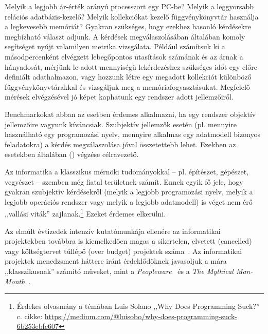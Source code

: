 \label{cha:benchmarking}

\graphicspath{ {./benchmarking/figures/} }

Melyik a legjobb ár-érték arányú processzort egy PC-be? Melyik a leggyorsabb relációs adatbázis-kezelő? Melyik kollekciókat kezelő függvénykönyvtár használja a legkevesebb memóriát? Gyakran szükséges, hogy ezekhez hasonló kérdésekre megbízható választ adjunk. A kérdések megválaszolásában általában komoly segítséget nyújt valamilyen metrika vizsgálata. Például számítsuk ki a másodpercenként elvégzett lebegőpontos utasítások számának és az árnak a hányadosát, mérjünk le adott mennyiségű lekérdezéshez szükséges időt egy előre definiált adathalmazon, vagy hozzunk létre egy megadott kollekciót különböző függvénykönyvtárakkal és vizsgáljuk meg a memóriafogyasztásukat. Megfelelő mérések elvégzésével jó képet kaphatunk egy rendszer adott jellemzőiről.

\begin{megjegyzes}
	Benchmarkokat abban az esetben érdemes alkalmazni, ha egy rendszer objektív jellemzőire vagyunk kíváncsiak. Szubjektív jellemzők esetén (pl. mennyire használható egy programozási nyelv, mennyire alkalmas egy adatmodell bizonyos feladatokra) a kérdés megválaszolása jóval összetettebb lehet. Ezekben az esetekben általában  () végzése célravezető.
	
	Az informatika a klasszikus mérnöki tudományokkal -- pl. építészet, gépészet, vegyészet -- szemben még fiatal területnek számít. Ennek egyik fő jele, hogy gyakran szubjektív kérdésekről (melyik a legjobb programozási nyelv, melyik a legjobb operációs rendszer vagy melyik a legjobb adatmodell) is véget nem érő ,,vallási viták'' zajlanak.\footnote{Érdekes olvasmány a témában Luis Solano ,,Why Does Programming Suck?'' c. cikke: \url{https://medium.com/@luisobo/why-does-programming-suck-6b253ebfc607}} Ezeket érdemes elkerülni.
	
	Az elmúlt évtizedek intenzív kutatómunkája ellenére az informatikai projektekben továbbra is kiemelkedően magas a sikertelen, elvetett (cancelled) vagy költségtervet túllépő (over budget) projektek száma~\cite{HBR:ITProjects}. Az informatikai projektek menedzsment háttere iránt érdeklődőknek javasoljuk a mára ,,klasszikusnak'' számító műveket, mint a \emph{Peopleware}~\cite{demarco2013peopleware} és a \emph{The Mythical Man-Month}~\cite{brooks1995mythical}.
	
\end{megjegyzes}



